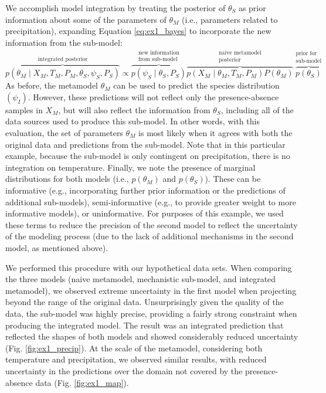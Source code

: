 We accomplish model integration by treating the posterior of \(\theta_S\) as prior information about some of the parameters of \(\theta_M\) (i.e., parameters related to precipitation), expanding Equation \ref{eq:ex1_bayes} to incorporate the new information from the sub-model:
\begin{equation}
	\label{eq:ex1_integrated}
	\overbrace{p(\theta_M \mid X_M, T_M, P_M, \theta_S, \psi_S, P_S)}^\text{integrated posterior}
	\propto
	\overbrace{p\left (\psi_S \mid \theta_S,P_S \right )}^{\substack{\text{new information} \\ \text{from sub-model}}}
	\overbrace{p \left(X_M \mid \theta_M, T_M, P_M \right) P \left(\theta_M \right)}^{\substack{\text{naive metamodel} \\ \text{posterior}}}
	\overbrace{p \left(\theta_S \right)}^{\substack{\text{prior for} \\ \text{sub-model}}}	
\end{equation}
As before, the metamodel \(\theta_M\) can be used to predict the species distribution \((\psi_I)\).
However, these predictions will not reflect only the presence-absence samples in \(X_M\), but will also reflect the information from \(\theta_S\), including all of the data sources used to produce this sub-model.
In other words, with this evaluation, the set of parameters $\theta_M$ is most likely when it agrees with both the original data and predictions from the sub-model. 
Note that in this particular example, because the sub-model is only contingent on precipitation, there is no integration on temperature. 
Finally, we note the presence of marginal distributions for both models (i.e., \(p(\theta_M)\) and \(p(\theta_S)\)).
These can be informative (e.g., incorporating further prior information or the predictions of additional sub-models), semi-informative (e.g., to provide greater weight to more informative models), or uninformative.
For purposes of this example, we used these terms to reduce the precision of the second model to reflect the uncertainty of the modeling process (due to the lack of additional mechanisms in the second model, as mentioned above).

We performed this procedure with our hypothetical data sets.
When comparing the three models (naive metamodel, mechanistic sub-model, and integrated metamodel), we observed extreme uncertainty in the first model when projecting beyond the range of the original data.
Unsurprisingly given the quality of the data, the sub-model was highly precise, providing a fairly strong constraint when producing the integrated model.
The result was an integrated prediction that reflected the shapes of both models and showed considerably reduced uncertainty (Fig. \ref{fig:ex1_precip}).
At the scale of the metamodel, considering both temperature and precipitation, we observed similar results, with reduced uncertainty in the predictions over the domain not covered by the presence-absence data (Fig. \ref{fig:ex1_map}).


